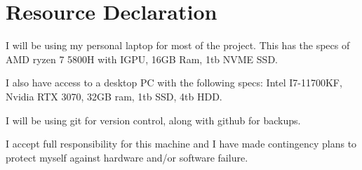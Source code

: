 \section*{Resource Declaration}

I will be using my personal laptop for most of the project. This has
the specs of AMD ryzen 7 5800H with IGPU, 16GB Ram, 1tb NVME SSD.

I also have access to a desktop PC with the following specs:
Intel I7-11700KF, Nvidia RTX 3070, 32GB ram, 1tb SSD, 4tb HDD.

I will be using git for version control, along with github for backups.

I accept full responsibility for this machine and I have made contingency plans
to protect myself against hardware and/or software failure.
